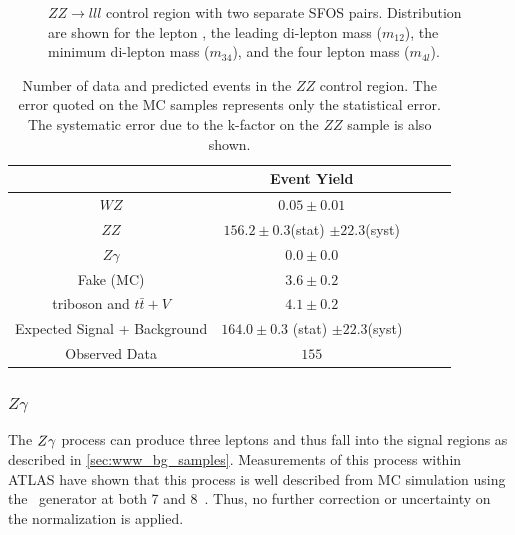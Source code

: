 \begin{figure}[htp]
\caption{$ZZ\rightarrow lll$ control region with two separate SFOS pairs. 
Distribution are shown for the lepton \pt, the leading di-lepton mass ($m_{12}$), 
the minimum di-lepton mass ($m_{34}$), and the four lepton mass ($m_{4l}$).}
\label{fig:ZZ_CR}
\end{figure}  

\begin{table}[htp]
\centering
\begin{tabular}{|c||c|c|c|c|}
\hline
 & Event Yield\\ 
\hline\hline
$WZ$ &  $0.05 \pm 0.01$\\ 
$ZZ$ &  $156.2 \pm 0.3$(stat) $\pm 22.3$(syst) \\ 
$Z\gamma$ &  $0.0 \pm 0.0$\\ 
Fake (MC) &  $3.6 \pm 0.2$\\ 
triboson and $t\bar{t}+V$ &  $4.1 \pm 0.2$\\ 
\hline
Expected Signal + Background &  $164.0 \pm 0.3$ (stat) $\pm 22.3$(syst)\\ 
\hline
Observed Data &  $155$\\ %
\hline
\end{tabular}
\caption{Number of data and predicted events in the $ZZ$ control region. 
The error quoted on the MC samples represents only the statistical error. 
The systematic error due to the k-factor on the $ZZ$ sample is also shown.}
\label{tab:ZZ_CR}
\end{table}


\clearpage

\subsubsection{$Z\gamma$}
\label{sec:zgammabg}

The $Z\gamma$ process can produce three leptons and thus fall into the 
signal regions as described in \sec\ref{sec:www_bg_samples}.
Measurements of this process within ATLAS
have shown that this process is well described from MC simulation
using the \sherpa~generator at both 7 and 8\TeV~\cite{Aad:2013izg,Auerbach:1631102}.
Thus, no further correction or uncertainty on the normalization is applied.

